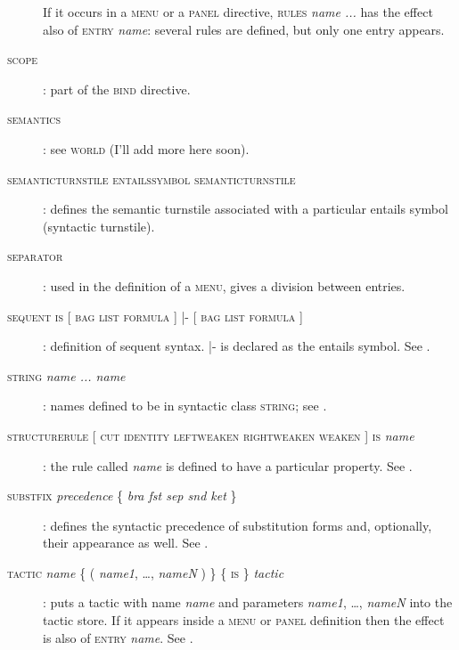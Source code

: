 \begin{description}
If it occurs in a \textsc{menu} or a \textsc{panel} directive, \textsc{rules} \textit{name ...} has the effect also of \textsc{entry} \textit{name}: several rules are defined, but only one entry appears.

\item[\textsc{scope}]: part of the \textsc{bind} directive.

\item[\textsc{semantics}]: see \textsc{world} (I'll add more here soon).

\item[\textsc{semanticturnstile} \textsc{entailssymbol} \textsc{semanticturnstile}]: defines the semantic turnstile associated with a particular entails symbol (syntactic turnstile).

\item[\textsc{separator}]: used in the definition of a \textsc{menu}, gives a division between entries. %

\item[\textsc{sequent is} {[} \textsc{bag} {\textbar} \textsc{list} {\textbar} \textsc{formula} {]} |- {[} \textsc{bag} {\textbar} \textsc{list} {\textbar} \textsc{formula} {]}]: definition of sequent syntax. |- is declared as the entails symbol. See .

\item[\textsc{string} \textit{name ... name}]: names defined to be in syntactic class \textsc{string}; see .

\item[\textsc{structurerule} {[} \textsc{cut} {\textbar} \textsc{identity} {\textbar} \textsc{leftweaken} {\textbar} \textsc{rightweaken} {\textbar} \textsc{weaken} {]} \textsc{is} \textit{name}]: the rule called \textit{name} is defined to have a particular property. See .

\item[\textsc{substfix} \textit{precedence} \{ \textit{bra fst sep snd ket} \}]: defines the syntactic precedence of substitution forms and, optionally, their appearance as well. See .

\item[\textsc{tactic} \textit{name} \{ ( \textit{name1}, \dots, \textit{nameN} ) \} \{ \textsc{is} \} \textit{tactic}]: puts a tactic with name \textit{name} and parameters \textit{name1}, \dots, \textit{nameN} into the tactic store. If it appears inside a \textsc{menu} or \textsc{panel} definition then the effect is also of \textsc{entry} \textit{name}.%
See .


\end{description}
